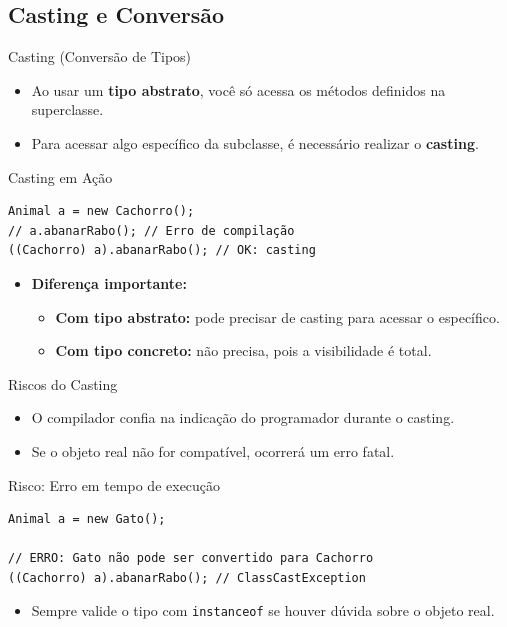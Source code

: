\documentclass[9pt]{beamer}
\begin{document}
\subsection{Casting e Conversão}
\begin{frame}[fragile]{Casting (Conversão de Tipos)}
\begin{itemize}
    \item Ao usar um \textbf{tipo abstrato}, você só acessa os métodos definidos na superclasse.
    \item Para acessar algo específico da subclasse, é necessário realizar o \textbf{casting}.
\end{itemize}

\begin{block}{Casting em Ação}
\begin{verbatim}
Animal a = new Cachorro();
// a.abanarRabo(); // Erro de compilação
((Cachorro) a).abanarRabo(); // OK: casting
\end{verbatim}
\end{block}

\begin{itemize}
    \item \textbf{Diferença importante:}
    \begin{itemize}
        \item \textbf{Com tipo abstrato:} pode precisar de casting para acessar o específico.
        \item \textbf{Com tipo concreto:} não precisa, pois a visibilidade é total.
    \end{itemize}
\end{itemize}
\end{frame}

\begin{frame}[fragile]{Riscos do Casting}
\begin{itemize}
    \item O compilador confia na indicação do programador durante o casting.
    \item Se o objeto real não for compatível, ocorrerá um erro fatal.
\end{itemize}

\begin{alertblock}{Risco: Erro em tempo de execução}
\begin{verbatim}
Animal a = new Gato();

// ERRO: Gato não pode ser convertido para Cachorro
((Cachorro) a).abanarRabo(); // ClassCastException
\end{verbatim}
\end{alertblock}

\begin{itemize}
    \item Sempre valide o tipo com \texttt{instanceof} se houver dúvida sobre o objeto real.
\end{itemize}
\end{frame}
\end{document}
